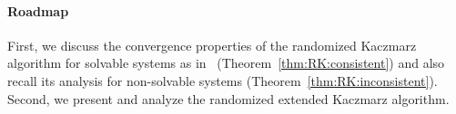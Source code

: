 %
%


%
\paragraph{Roadmap}
%
%
First, we discuss the convergence properties of the randomized Kaczmarz algorithm for solvable systems as in~\cite{RK} (Theorem~\ref{thm:RK:consistent}) and also recall its analysis for non-solvable systems (Theorem~\ref{thm:RK:inconsistent}). Second, we present and analyze the randomized extended Kaczmarz algorithm.
%
%
%
